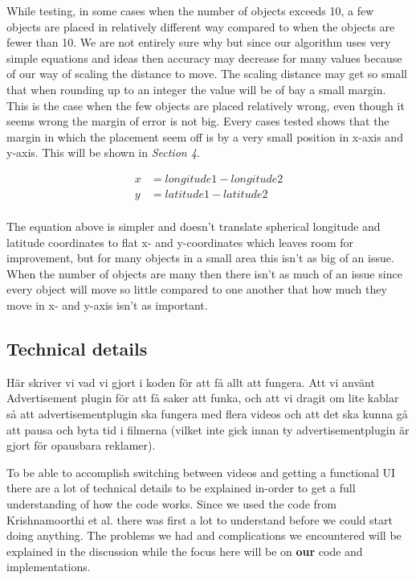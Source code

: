 \documentclass[9pt,a4paper]{acmproc}
\begin{document}
While testing, in some cases when the number of objects exceeds 10, a few objects are placed in relatively different way compared to when the objects are fewer than 10. We are not entirely sure why but since our algorithm uses very simple equations and ideas then accuracy may decrease for many values because of our way of scaling the distance to move. The scaling distance may get so small that when rounding up to an integer the value will be of bay a small margin. This is the case when the few objects are placed relatively wrong, even though it seems wrong the margin of error is not big. Every cases tested shows that the margin in which the placement seem off is by a very small position in x-axis and y-axis. This will be shown in \textit{Section 4}.


\begin{align*}
x &= longitude1-longitude2  \\
y &= latitude1-latitude2 \\
\end{align*}

The equation above is simpler and doesn't translate spherical longitude and latitude coordinates to flat x- and y-coordinates which leaves room for improvement, but for many objects in a small area this isn't as big of an issue. When the number of objects are many then there isn't as much of an issue since every object will move so little compared to one another that how much they move in x- and y-axis isn't as important. 

\subsection{Technical details}
Här skriver vi vad vi gjort i koden för att få allt att fungera. Att vi använt Advertisement plugin för att få saker att funka, och att vi dragit om lite kablar så att advertisementplugin ska fungera med flera videos och att det ska kunna gå att pausa och byta tid i filmerna (vilket inte gick innan ty advertisementplugin är gjort för opausbara reklamer).

To be able to accomplish switching between videos and getting a functional UI there are a lot of technical details to be explained in-order to get a full understanding of how the code works. Since we used the code from Krishnamoorthi et al.\cite{qualbranch} there was first a lot to understand before we could start doing anything. The problems we had and complications we encountered will be explained in the discussion while the focus here will be on \textbf{our} code and implementations. 
\end{document}
